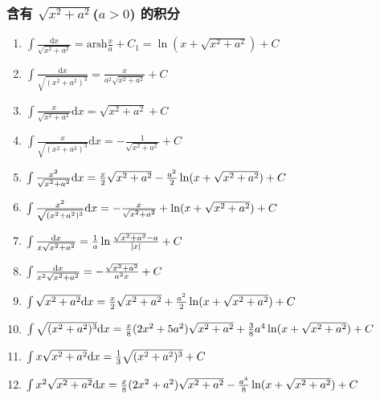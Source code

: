 \begin{small}
\begin{enumerate}
\end{enumerate}

\subsubsection{含有 $\sqrt{x^2+a^2}$($a>0$) 的积分}

\begin{enumerate}

\item $ \int \frac{\mathrm{d}x}{\sqrt{x^2+a^2}} = \mathrm{arsh} \frac{x}{a} + C_1 = \ln(x + \sqrt{x^2+a^2}) + C$

\item $ \int \frac{\mathrm{d}x}{\sqrt{(x^2+a^2)^3}} = \frac{x}{a^2\sqrt{x^2+a^2}} + C $

\item $ \int \frac{x}{\sqrt{x^2+a^2}} \mathrm{d}x = \sqrt{x^2+a^2} + C $

\item $ \int \frac{x}{\sqrt{(x^2+a^2)^3}} \mathrm{d}x = -\frac{1}{\sqrt{x^2+a^2}} + C $

\item $ \int \frac{x^2}{\sqrt{x^2+a^2}} \mathrm{d} x = \frac{x}{2}\sqrt{x^2+a^2} - \frac{a^2}{2}\ln(x+\sqrt{x^2+a^2}) + C $

\item $ \int \frac{x^2}{\sqrt{(x^2+a^2)^3}} \mathrm{d} x = -\frac{x}{\sqrt{x^2+a^2}} + \ln(x+\sqrt{x^2+a^2}) + C $

\item $ \int \frac{\mathrm{d} x}{x\sqrt{x^2+a^2}} = \frac{1}{a} \ln \frac{\sqrt{x^2+a^2}-a}{|x|} + C $

\item $ \int \frac{\mathrm{d} x}{x^2\sqrt{x^2+a^2}} = -\frac{\sqrt{x^2+a^2}}{a^2x} + C $

\item $ \int \sqrt{x^2+a^2} \mathrm{d} x = \frac{x}{2}\sqrt{x^2+a^2}+\frac{a^2}{2}\ln(x + \sqrt{x^2+a^2}) + C $

\item $ \int \sqrt{(x^2+a^2)^3} \mathrm{d} x = \frac{x}{8}(2x^2+5a^2)\sqrt{x^2+a^2} + \frac{3}{8}a^4\ln(x + \sqrt{x^2+a^2}) + C $

\item $ \int x \sqrt{x^2+a^2} \mathrm{d} x = \frac{1}{3} \sqrt{(x^2+a^2)^3} + C $

\item $ \int x^2\sqrt{x^2+a^2} \mathrm{d} x = \frac{x}{8}(2x^2+a^2)\sqrt{x^2+a^2} - \frac{a^4}{8}\ln(x+\sqrt{x^2+a^2}) + C $


\end{enumerate}
\end{small}
